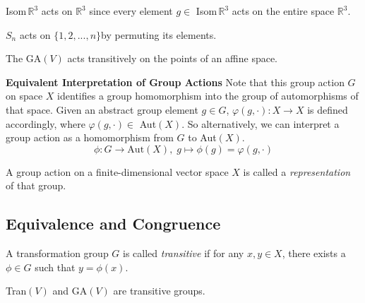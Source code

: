 \documentclass{article}
\begin{document}
  \begin{example}
    Isom$\,\mathbb{R}^{3}$ acts on $\mathbb{R}^{3}$ since every element $g \in$ Isom$\,\mathbb{R}^{3}$ acts on the entire space $\mathbb{R}^{3}$. 
  \end{example}

  \begin{example}
    $S_n$ acts on $\{1, 2, ..., n\}$by permuting its elements.
  \end{example}

  \begin{example}
    The GA$(V)$ acts transitively on the points of an affine space.
  \end{example}

  \textbf{Equivalent Interpretation of Group Actions}
  Note that this group action $G$ on space $X$ identifies a group homomorphism into the group of automorphisms of that space. Given an abstract group element $g \in G$, $\varphi(g, \cdot): X \longrightarrow X$ is defined accordingly, where $\varphi(g, \cdot) \in $ Aut$(X)$. So alternatively, we can interpret a group action as a homomorphism from $G$ to Aut$(X)$. 
  \begin{equation}
    \phi: G \longrightarrow \text{Aut}(X), \; g \mapsto \phi(g) = \varphi(g,\cdot)
  \end{equation}

  \begin{definition}
    A group action on a finite-dimensional vector space $X$ is called a \textit{representation} of that group. 
  \end{definition}

\subsection{Equivalence and Congruence}

  \begin{definition}
    A transformation group $G$ is called \textit{transitive} if for any $x, y \in X$, there exists a $\phi \in G$ such that $y = \phi(x)$. 
  \end{definition}

  \begin{example}
    Tran$(V)$ and GA$(V)$ are transitive groups. 
  \end{example}
\end{document}
